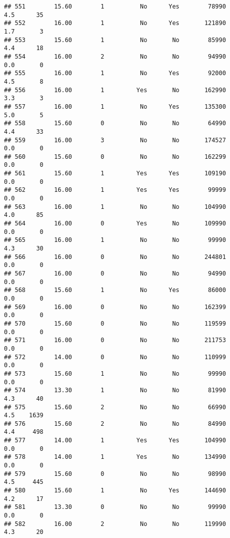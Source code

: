 \documentclass[
]{article}
\begin{document}
\begin{verbatim}
## 551        15.60        1          No      Yes        78990         4.5      35
## 552        16.00        1          No      Yes       121890         1.7       3
## 553        15.60        1          No       No        85990         4.4      18
## 554        16.00        2          No       No        94990         0.0       0
## 555        16.00        1          No      Yes        92000         4.5       8
## 556        16.00        1         Yes       No       162990         3.3       3
## 557        16.00        1          No      Yes       135300         5.0       5
## 558        15.60        0          No       No        64990         4.4      33
## 559        16.00        3          No       No       174527         0.0       0
## 560        15.60        0          No       No       162299         0.0       0
## 561        15.60        1         Yes      Yes       109190         0.0       0
## 562        16.00        1         Yes      Yes        99999         0.0       0
## 563        16.00        1          No       No       104990         4.0      85
## 564        16.00        0         Yes       No       109990         0.0       0
## 565        16.00        1          No       No        99990         4.3      30
## 566        16.00        0          No       No       244801         0.0       0
## 567        16.00        0          No       No        94990         0.0       0
## 568        15.60        1          No      Yes        86000         0.0       0
## 569        16.00        0          No       No       162399         0.0       0
## 570        15.60        0          No       No       119599         0.0       0
## 571        16.00        0          No       No       211753         0.0       0
## 572        14.00        0          No       No       110999         0.0       0
## 573        15.60        1          No       No        99990         0.0       0
## 574        13.30        1          No       No        81990         4.3      40
## 575        15.60        2          No       No        66990         4.5    1639
## 576        15.60        2          No       No        84990         4.4     498
## 577        14.00        1         Yes      Yes       104990         0.0       0
## 578        14.00        1         Yes       No       134990         0.0       0
## 579        15.60        0          No       No        98990         4.5     445
## 580        15.60        1          No      Yes       144690         4.2      17
## 581        13.30        0          No       No        99990         0.0       0
## 582        16.00        2          No       No       119990         4.3      20

\end{verbatim}
\end{document}
